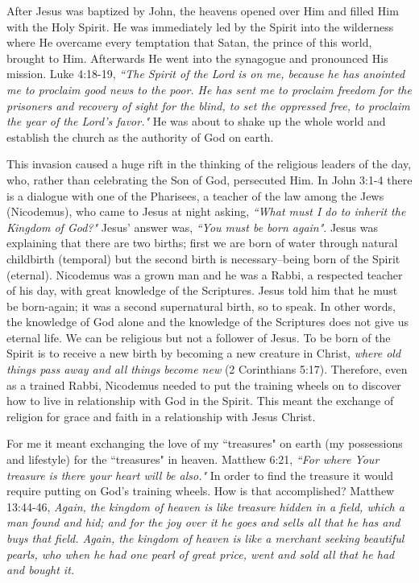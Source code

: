 \documentclass[oneside]{book}
\begin{document}
After Jesus was baptized by John, the heavens opened over Him and filled Him with the Holy Spirit. He was immediately led by the Spirit into the wilderness where He overcame every temptation that Satan, the prince of this world, brought to Him. Afterwards He went into the synagogue and pronounced His mission. Luke 4:18-19, \textit{``The Spirit of the Lord is on me, because he has anointed me to proclaim good news to the poor. He has sent me to proclaim freedom for the prisoners and recovery of sight for the blind, to set the oppressed free, to proclaim the year of the Lord's favor."} He was about to shake up the whole world and establish the church as the authority of God on earth. 

This invasion caused a huge rift in the thinking of the religious leaders of the day, who, rather than celebrating the Son of God, persecuted Him. In John 3:1-4 there is a dialogue with one of the Pharisees, a teacher of the law among the Jews (Nicodemus), who came to Jesus at night asking, \textit{``What must I do to inherit the Kingdom of God?"} Jesus' answer was, \textit{``You must be born again"}. Jesus was explaining that there are two births; first we are born of water through natural childbirth (temporal) but the second birth is necessary--being born of the Spirit (eternal). Nicodemus was a grown man and he was a Rabbi, a respected teacher of his day, with great knowledge of the Scriptures. Jesus told him that he must be born-again; it was a second supernatural birth, so to speak. In other words, the knowledge of God alone and the knowledge of the Scriptures does not give us eternal life. We can be religious but not a follower of Jesus. To be born of the Spirit is to receive a new birth by becoming a new creature in Christ, \textit{where old things pass away and all things become new} (2 Corinthians 5:17). Therefore, even as a trained Rabbi, Nicodemus needed to put the training wheels on to discover how to live in relationship with God in the Spirit. This meant the exchange of religion for grace and faith in a relationship with Jesus Christ. 

For me it meant exchanging the love of my ``treasures" on earth (my possessions and lifestyle) for the ``treasures" in heaven. Matthew 6:21, \textit{``For where Your treasure is there your heart will be also."} In order to find the treasure it would require putting on God's training wheels. How is that accomplished? Matthew 13:44-46, \textit{Again, the kingdom of heaven is like treasure hidden in a field, which a man found and hid; and for the joy over it he goes and sells all that he has and buys that field. Again, the kingdom of heaven is like a merchant seeking beautiful pearls, who when he had one pearl of great price, went and sold all that he had and bought it.}
\end{document}
